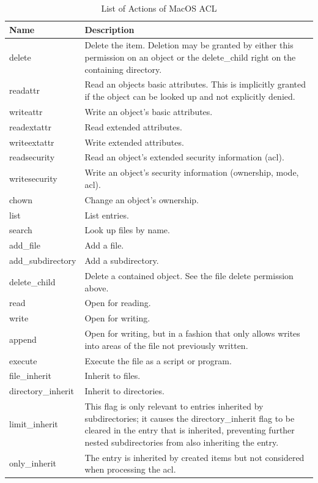 \documentclass[a4paper]{article}
\begin{document}
\begin{table}
\centering
\caption{List of Actions of MacOS ACL}
\label{tbl:macosaclactions}
\begin{tabular}{@{}lp{8cm}@{}}
\toprule
Name & Description\\
\midrule
delete & Delete the item.  Deletion may be granted by either this permission on an object or the delete_child right on the containing directory.\\
readattr & Read an objects basic attributes.  This is implicitly granted if the object can be looked up and not explicitly denied.\\
writeattr & Write an object's basic attributes.\\
readextattr & Read extended attributes.\\
writeextattr & Write extended attributes.\\
readsecurity & Read an object's extended security information (\gls{acl}).\\
writesecurity & Write an object's security information (ownership, mode, \gls{acl}).\\
chown & Change an object's ownership.\\
\midrule
list & List entries.\\
search & Look up files by name.\\
add_file & Add a file.\\
add_subdirectory & Add a subdirectory.\\
delete_child & Delete a contained object. See the file delete permission above.\\
\midrule
read & Open for reading.\\
write & Open for writing.\\
append & Open for writing, but in a fashion that only allows writes into areas of the file not previously written.\\
execute & Execute the file as a script or program.\\
\midrule
file_inherit & Inherit to files.\\
directory_inherit & Inherit to directories.\\
limit_inherit &  This flag is only relevant to entries inherited by subdirectories; it causes the directory_inherit flag to be cleared in the entry that is inherited, preventing further nested subdirectories from also inheriting the entry.\\
only_inherit & The entry is inherited by created items but not considered when processing the \gls{acl}.\\
\bottomrule
\end{tabular}
\end{table}
\end{document}
